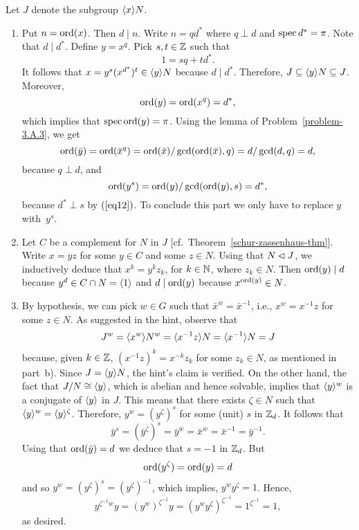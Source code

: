 \begin{solution} Let $J$ denote the subgroup $\langle x\rangle N$.

\begin{enumerate}[\rm a)]
    \item Put $n={\rm ord}(x)$. Then $d\mid n$. Write $n=qd^*$ where $q\perp d$ and $\operatorname{spec}d^*=\pi$. Note that $d\mid d^*$. Define $y=x^q$. Pick $s,t\in\mathbb{Z}$ such that
    \begin{equation}\label{eq12}
        1 = sq + td^*.
    \end{equation}
    It follows that $x=y^s(x^{d^*})^t\in\langle y\rangle N$ because $d\mid d^*$. Therefore, $J\subseteq\langle y\rangle N\subseteq J$. Moreover,
    $$
        {\rm ord}(y) = {\rm ord}(x^q) = d^*,
    $$
    which implies that $\operatorname{spec}{\rm ord}(y)=\pi$. Using the lemma of Problem~\ref{problem-3.A.3}, we get
    $$
        {\rm ord}(\bar y)={\rm ord}(\bar x^q)={\rm ord}(\bar x)/\gcd({\rm ord}(\bar x),q)
            =d/\gcd(d,q)=d,
    $$
    because $q\perp d$, and
    $$
        {\rm ord}(y^s)= {\rm ord}(y)/\gcd({\rm ord}(y),s)=d^*,
    $$
    because $d^*\perp s$ by $(\ref{eq12})$. To conclude this part we only have to replace $y$ with~$y^s$.
    
    \item Let $C$ be a complement for $N$ in $J$ [cf.~Theorem~\ref{schur-zassenhaus-thm}]. Write $x=yz$ for some $y\in C$ and some $z\in N$. Using that $N\lhd J$, we inductively deduce that $x^k=y^kz_k$, for $k\in\mathbb{N}$, where $z_k\in N$. Then ${\rm ord}(y)\mid d$ because $y^d\in C\cap N=\langle1\rangle$ and $d\mid{\rm ord}(y)$ because $x^{{\rm ord}(y)}\in N$.

    \item By hypothesis, we can pick $w\in G$ such that $\bar x^{\bar w}=\bar x^{-1}$, i.e., $x^w=x^{-1}z$ for some $z\in N$. As suggested in the hint, observe that
    $$
        J^w = \langle x^w\rangle N^w = \langle x^{-1}z\rangle N =\langle x^{-1}\rangle N= J
    $$
    because, given $k\in\mathbb{Z}$, $(x^{-1}z)^k=x^{-k}z_k$ for some $z_k\in N$, as mentioned in part~b). Since $J=\langle y\rangle N$, the hint's claim is verified. On the other hand, the fact that $J/N\cong\langle y\rangle$, which is abelian and hence solvable, implies that $\langle y\rangle^w$ is a conjugate of $\langle y\rangle$ in $J$. This means that there exists $\zeta\in N$ such that $\langle y\rangle^w=\langle y\rangle^\zeta$. Therefore, $y^w=(y^\zeta)^s$ for some (unit) $s$ in $\mathbb{Z}_d$. It follows that
    $$
        \bar y^s=(\bar y^{\bar\zeta})^s=\bar y^{\bar w}=\bar x^{\bar w}=\bar x^{-1}=\bar y^{-1}.
    $$
    Using that ${\rm ord}(\bar y)=d$ we deduce that $s=-1$ in $\mathbb{Z}_d$. But
    $$
        {\rm ord}(y^\zeta)={\rm ord}(y)=d
    $$
    and so $y^w=(y^\zeta)^s=(y^\zeta)^{-1}$, which implies, $y^wy^\zeta=1$. Hence,
    $$
        y^{\zeta^{-1}w}y= (y^w)^{\zeta^{-1}}y=(y^wy^\zeta)^{\zeta^{-1}}=1^{\zeta^{-1}}=1,
    $$
    as desired.
\end{enumerate}
\end{solution}


